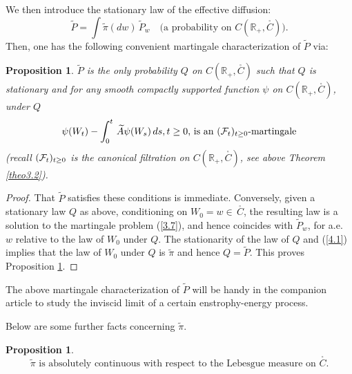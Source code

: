 \documentclass[12pt,leqno]{article}
\def\IR{{\mathbb R}}
\def\dis{\displaystyle}
\def\wt{\widetilde}
\def\cF{{\cal F}}
\newtheorem{proposition}[theorem]{Proposition}
\begin{document}
\medskip
We then introduce the stationary law of the effective diffusion: 
\begin{equation}\label{4.5}
\wt{P} = \dis\int \wt{\pi} (dw) \, \wt{P}_w \quad \mbox{(a probability on $C(\IR_+, \stackrel{_\circ}{C})$)}.
\end{equation}
Then, one has the following convenient martingale characterization of $\wt{P}$ via: 
\begin{proposition}\label{prop4.2}
$\wt{P}$ is the only probability $Q$ on $C(\IR_+, \stackrel{_\circ}{C})$ such that $Q$ is stationary and for any smooth compactly supported function $\psi$ on $C(\IR_+, \stackrel{_\circ}{C})$, under $Q$
\begin{equation*}
\mbox{$\psi (W_t) - \dis\int^t_0 \,\wt{A}\psi (W_s) \, ds, t \ge 0$, is an $(\cF_t)_{t \ge 0}$-martingale}
\end{equation*}
(recall $(\cF_t)_{t \ge 0}$ is the canonical filtration on $C(\IR_+, \stackrel{_\circ}{C})$, see above Theorem \ref{theo3.2}).
\end{proposition}

\begin{proof}
That $\wt{P}$ satisfies these conditions is immediate. Conversely, given a stationary law $Q$ as above, conditioning on $W_0 = w \in \, \stackrel{_\circ}{C}$, the resulting law is a solution to the martingale problem (\ref{3.7}), and hence coincides with $\wt{P}_w$, for a.e.~$w$ relative to the law of $W_0$ under $Q$. The stationarity of the law of $Q$ and (\ref{4.1}) implies that the law of $W_0$ under $Q$ is $\wt{\pi}$ and hence $Q = \wt{P}$. This proves Proposition \ref{prop4.2}.
\end{proof} 

\medskip
The above martingale characterization of $\wt{P}$ will be handy in the companion article \cite{SzniWidm26b} to study the inviscid limit of a certain enstrophy-energy process.

\medskip
Below are some further facts concerning $\wt{\pi}$.

\begin{proposition}\label{prop4.3}
\begin{equation}\label{4.6}
\mbox{$\wt{\pi}$ is absolutely continuous with respect to the Lebesgue measure on $\stackrel{_\circ}{C}$}.
\end{equation}
\end{proposition}
\end{document}
